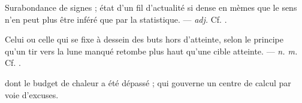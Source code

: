  Surabondance de signes ; état d'un fil d'actualité si dense en mèmes que le sens n'en peut plus être inféré que par la statistique. ---  \textit{adj.} Cf. .

 Celui ou celle qui se fixe à dessein des buts hors d'atteinte, selon le principe qu'un tir vers la lune manqué retombe plus haut qu'une cible atteinte. ---  \textit{n. m.} Cf. .

   dont le budget de chaleur a été dépassé ; qui gouverne un centre de calcul par voie d'excuses.
